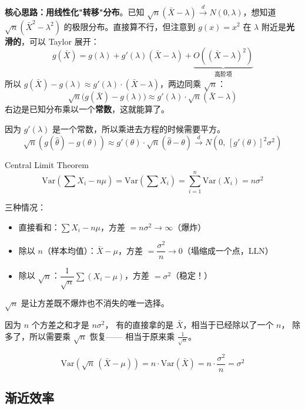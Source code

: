  \begin{note}[Delta 方法]
\textbf{核心思路：用线性化"转移"分布}。已知 $\sqrt{n}(\bar{X} - \lambda) \xrightarrow{d} N(0, \lambda)$，想知道 $\sqrt{n}(\bar{X}^2 - \lambda^2)$ 的极限分布。直接算不行，但注意到 $g(x) = x^2$ 在 $\lambda$ 附近是\textbf{光滑的}，可以 Taylor 展开：
$$g(\bar{X}) = g(\lambda) + g'(\lambda)(\bar{X} - \lambda) + \underbrace{O((\bar{X} - \lambda)^2)}_{\text{高阶项}}$$
所以 $g(\bar{X}) - g(\lambda) \approx g'(\lambda) \cdot (\bar{X} - \lambda)$，两边同乘 $\sqrt{n}$：
$$\sqrt{n}\bigl(g(\bar{X}) - g(\lambda)\bigr) \approx g'(\lambda) \cdot \sqrt{n}(\bar{X} - \lambda)$$
右边是已知分布乘以一个\textbf{常数}，这就能算了。
\end{note}
\begin{dxtips}
   因为 $g'(\lambda)$ 是一个常数，所以乘进去方程的时候需要平方。
$$\sqrt{n}(g(\hat{\theta}) - g(\theta)) \approx g'(\theta) \cdot \sqrt{n}(\hat{\theta} - \theta) \xrightarrow{d} N(0,\, [g'(\theta)]^2\sigma^2)$$
\end{dxtips}
\begin{note}[中心极限定理详解]
 Central Limit Theorem
$$\text{Var}\!\left(\sum X_i - n\mu\right) = \text{Var}\!\left(\sum X_i\right) = \sum_{i=1}^n \text{Var}(X_i) = n\sigma^2$$


三种情况：
\begin{itemize}
  \item 直接看和：$\displaystyle\sum X_i - n\mu$，方差 $= n\sigma^2 \to \infty$（爆炸）
  \item 除以 $n$（样本均值）：$\bar{X} - \mu$，方差 $= \dfrac{\sigma^2}{n} \to 0$（塌缩成一个点，LLN）
  \item 除以 $\sqrt{n}$：$\dfrac{1}{\sqrt{n}}\displaystyle\sum(X_i-\mu)$，方差 $= \sigma^2$（稳定！）
\end{itemize}

$\sqrt{n}$ 是让方差既不爆炸也不消失的唯一选择。
\end{note}
\begin{dxtips}
因为 $n$ 个方差之和才是 $n\sigma^2$，
有的直接拿的是 $\bar{X}$，相当于已经除以了一个 $n$，
除多了，所以需要乘 $\sqrt{n}$ 恢复——
相当于原来乘 $\frac{1}{\sqrt{n}}$。

$$\text{Var}\!\left(\sqrt{n}\,(\bar{X}-\mu)\right)
= n \cdot \text{Var}(\bar{X})
= n \cdot \frac{\sigma^2}{n} = \sigma^2$$
\end{dxtips}
\subsection{渐近效率}

